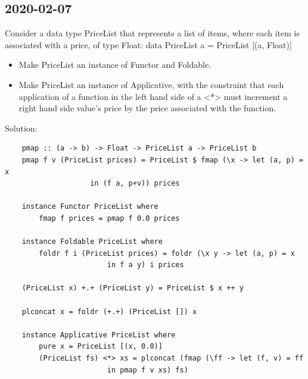 \subsection{2020-02-07}
Consider a data type PriceList that represents a list of items, where each item is associated with a price,
of type Float:
data PriceList a = PriceList [(a, Float)]
\begin{itemize}
	\item Make PriceList an instance of Functor and Foldable.
	\item Make PriceList an instance of Applicative, with the constraint that each application of a function in the left hand side of a <*> must increment a right hand side value’s price by the price associated with the function.
\end{itemize}
Solution:
\begin{lstlisting}
	pmap :: (a -> b) -> Float -> PriceList a -> PriceList b
	pmap f v (PriceList prices) = PriceList $ fmap (\x -> let (a, p) = x
					in (f a, p+v)) prices
	
	instance Functor PriceList where
		fmap f prices = pmap f 0.0 prices
	
	instance Foldable PriceList where
		foldr f i (PriceList prices) = foldr (\x y -> let (a, p) = x
						in f a y) i prices
	
	(PriceList x) +.+ (PriceList y) = PriceList $ x ++ y
	
	plconcat x = foldr (+.+) (PriceList []) x
	
	instance Applicative PriceList where
		pure x = PriceList [(x, 0.0)]
		(PriceList fs) <*> xs = plconcat (fmap (\ff -> let (f, v) = ff
						in pmap f v xs) fs)
\end{lstlisting}






